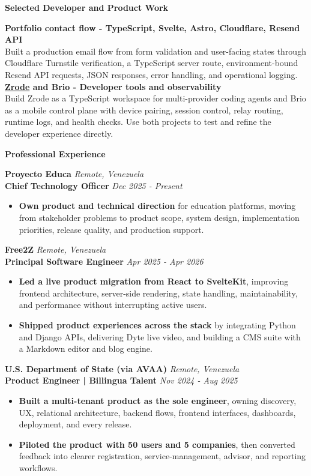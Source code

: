 \documentclass[10pt]{article}
\newcommand{\sectiontitle}[1]{%
    \vspace{3pt}
    \begin{center}
        \textbf{#1}
    \end{center}
    \vspace{-7pt}
}
\begin{document}
\sectiontitle{Selected Developer and Product Work}
\textbf{Portfolio contact flow - TypeScript, Svelte, Astro, Cloudflare, Resend API} \\
Built a production email flow from form validation and user-facing states through Cloudflare Turnstile verification, a TypeScript server route, environment-bound Resend API requests, JSON responses, error handling, and operational logging. \\
\textbf{\href{https://github.com/0bkevin/zrode}{Zrode} and Brio - Developer tools and observability} \\
Build Zrode as a TypeScript workspace for multi-provider coding agents and Brio as a mobile control plane with device pairing, session control, relay routing, runtime logs, and health checks. Use both projects to test and refine the developer experience directly.

\sectiontitle{Professional Experience}

\textbf{Proyecto Educa} \hfill \textit{Remote, Venezuela} \\
\textbf{Chief Technology Officer} \hfill \textit{Dec 2025 - Present}
\begin{itemize}
    \item \textbf{Own product and technical direction} for education platforms, moving from stakeholder problems to product scope, system design, implementation priorities, release quality, and production support.
\end{itemize}

\vspace{2pt}
\textbf{Free2Z} \hfill \textit{Remote, Venezuela} \\
\textbf{Principal Software Engineer} \hfill \textit{Apr 2025 - Apr 2026}
\begin{itemize}
    \item \textbf{Led a live product migration from React to SvelteKit}, improving frontend architecture, server-side rendering, state handling, maintainability, and performance without interrupting active users.
    \item \textbf{Shipped product experiences across the stack} by integrating Python and Django APIs, delivering Dyte live video, and building a CMS suite with a Markdown editor and blog engine.
\end{itemize}

\vspace{2pt}
\textbf{U.S. Department of State (via AVAA)} \hfill \textit{Remote, Venezuela} \\
\textbf{Product Engineer | Billingua Talent} \hfill \textit{Nov 2024 - Aug 2025}
\begin{itemize}
    \item \textbf{Built a multi-tenant product as the sole engineer}, owning discovery, UX, relational architecture, backend flows, frontend interfaces, dashboards, deployment, and every release.
    \item \textbf{Piloted the product with 50 users and 5 companies}, then converted feedback into clearer registration, service-management, advisor, and reporting workflows.
\end{itemize}
\end{document}
